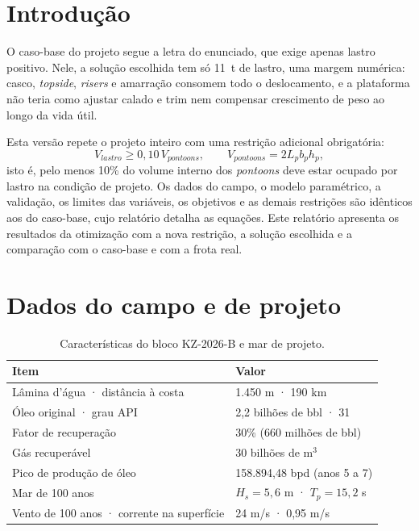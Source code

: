 \documentclass[11pt,a4paper]{article}
\begin{document}
\tableofcontents
\newpage

\section{Introdução}

O caso-base do projeto segue a letra do enunciado, que exige apenas lastro positivo. Nele, a
solução escolhida tem só 11~t de lastro, uma margem numérica: casco, \emph{topside},
\emph{risers} e amarração consomem todo o deslocamento, e a plataforma não teria como ajustar
calado e trim nem compensar crescimento de peso ao longo da vida útil.

Esta versão repete o projeto inteiro com uma restrição adicional obrigatória:
\begin{equation}
V_{lastro} \ge 0{,}10\,V_{pontoons}, \qquad V_{pontoons} = 2 L_p b_p h_p ,
\end{equation}
isto é, pelo menos 10\% do volume interno dos \emph{pontoons} deve estar ocupado por lastro na
condição de projeto. Os dados do campo, o modelo paramétrico, a validação, os limites das
variáveis, os objetivos e as demais restrições são idênticos aos do caso-base, cujo relatório
detalha as equações. Este relatório apresenta os resultados da otimização com a nova restrição,
a solução escolhida e a comparação com o caso-base e com a frota real.

\section{Dados do campo e de projeto}

\begin{table}[H]
\centering
\caption{Características do bloco KZ-2026-B e mar de projeto.}\label{tab:campo}
\begin{tabular}{ll}
\toprule
Item & Valor \\
\midrule
Lâmina d'água · distância à costa & 1.450 m · 190 km \\
Óleo original · grau API & 2,2 bilhões de bbl · 31 \\
Fator de recuperação & 30\% (660 milhões de bbl) \\
Gás recuperável & 30 bilhões de m$^3$ \\
Pico de produção de óleo & 158.894,48 bpd (anos 5 a 7) \\
Mar de 100 anos & $H_s = 5{,}6$ m · $T_p = 15{,}2$ s \\
Vento de 100 anos · corrente na superfície & 24 m/s · 0,95 m/s \\
\bottomrule
\end{tabular}
\end{table}
\end{document}
